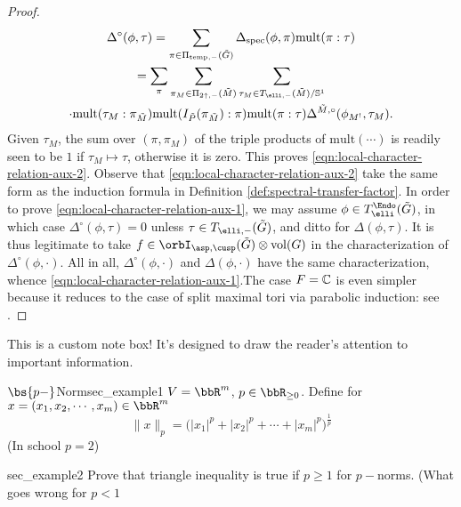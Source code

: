 \documentclass[12pt, a3paper, openany]{book}
\begin{document}
\begin{proof}
\begin{multline*}
\Delta^\circ(\phi, \tau) = \sum_{\pi \in \Pi_{\mathrm{temp}, -}(\tilde{G})} \Delta_{\mathrm{spec}}(\phi, \pi) \mathrm{mult}(\pi : \tau) \\
		= \sum_\pi \sum_{\pi_M \in \Pi_{2\uparrow, -}(\tilde{M})} \sum_{\tau_M \in T_{\elli, -}(\tilde{M})/\mathbb{S}^1} \\
		\cdot \mathrm{mult}(\tau_M : \pi_{\tilde{M}}) \mathrm{mult}(I_{\tilde{P}}(\pi_{\tilde{M}}) : \pi ) \mathrm{mult}(\pi : \tau) \Delta^{\tilde{M}, \circ}(\phi_{M^!}, \tau_M).
\end{multline*} Given $\tau_M$, the sum over $(\pi, \pi_M)$ of the triple products of $\mathrm{mult}(\cdots)$ is readily seen to be $1$ if $\tau_M \mapsto \tau$, otherwise it is zero. This proves \eqref{eqn:local-character-relation-aux-2}. Observe that \eqref{eqn:local-character-relation-aux-2} take the same form as the induction formula in Definition \ref{def:spectral-transfer-factor}. In order to prove \eqref{eqn:local-character-relation-aux-1}, we may assume $\phi \in T^{\Endo}_{\elli}(\tilde{G})$, in which case $\Delta^\circ(\phi, \tau) = 0$ unless $\tau \in T_{\elli, -}(\tilde{G})$, and ditto for $\Delta(\phi, \tau)$. It is thus legitimate to take $f \in \orbI_{\asp, \cusp}(\tilde{G}) \otimes \mes(G)$ in the characterization of $\Delta^\circ(\phi, \cdot)$. All in all, $\Delta^\circ(\phi, \cdot)$ and $\Delta(\phi, \cdot)$ have the same characterization, whence \eqref{eqn:local-character-relation-aux-1}.The case $F = \mathbb{C}$ is even simpler because it reduces to the case of split maximal tori via parabolic induction: see \cite[\S 7.6]{Li19}.
\end{proof}
\begin{note}
This is a custom note box! It's designed to draw the reader's attention to important information.
\end{note}
\begin{Example}{$\bs{p-}$Norm}{sec_example1}
\label{pnorm}$V={\bbR}^m$, $p\in\bbR_{\geq 0}$. Define for $x=(x_1,x_2,\cdots,x_m)\in\bbR^m$ $$\|x\|_p=\Big(|x_1|^p+|x_2|^p+\cdots+|x_m|^p\Big)^{\frac1p}$$(In school $p=2$)
\end{Example}
\begin{Example}{}{sec_example2}
Prove that triangle inequality is true if $p\geq 1$ for $p-$norms. (What goes wrong for $p<1$
\end{Example}
\end{document}
